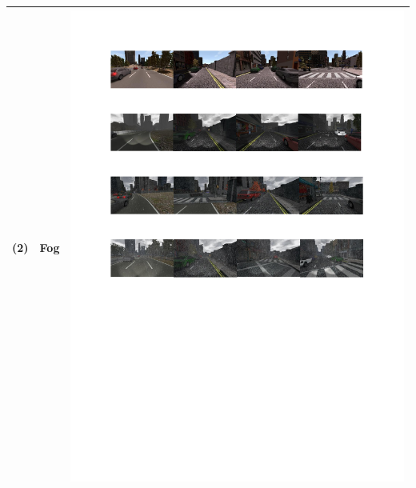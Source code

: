 \documentclass[a4paper,twoside]{article}
\begin{document}
\begin{table}[!t]
\begin{tabular}{|C{1cm}|c|C{11.5cm}|}
		(2) & Fog	& \begin{minipage}{.9\textwidth}\includegraphics[scale=.7,trim=2cm 20.5cm 2cm 6.5cm,clip]{examples.pdf}\end{minipage} \\ \hline

\end{tabular}
\end{table}
\end{document}
